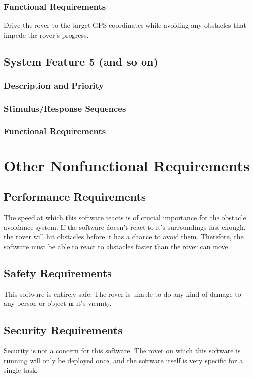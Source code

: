 \documentclass{scrreprt}
\begin{document}
\subsection{Functional Requirements}
Drive the rover to the target GPS coordinates while avoiding any obstacles that impede the rover's progress.
\section{System Feature 5 (and so on)}

\subsection{Description and Priority}



\subsection{Stimulus/Response Sequences}


\subsection{Functional Requirements}


\chapter{Other Nonfunctional Requirements}

\section{Performance Requirements}
The speed at which this software reacts is of crucial importance for the obstacle avoidance system. If the software doesn't react to it's surroundings fast enough, the rover will hit obstacles before it has a chance to avoid them. Therefore, the software must be able to react to obstacles faster than the rover can move. 

\section{Safety Requirements}
This software is entirely safe. The rover is unable to do any kind of damage to any person or object in it's vicinity.

\section{Security Requirements}
Security is not a concern for this software. The rover on which this software is running will only be deployed once, and the software itself is very specific for a single task. 
\end{document}
